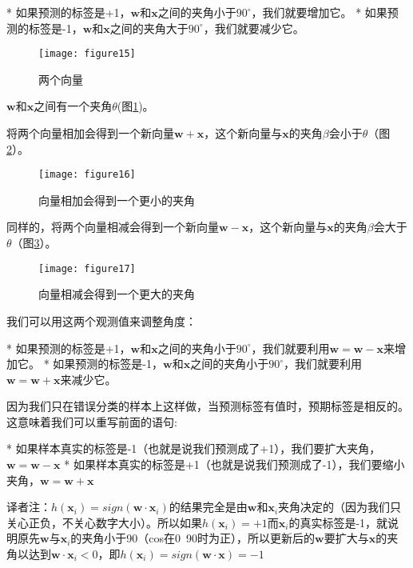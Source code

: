 * 如果预测的标签是+1，$\mathbf{w}$和$\mathbf{x}$之间的夹角小于$90^{\circ}$，我们就要增加它。
* 如果预测的标签是-1，$\mathbf{w}$和$\mathbf{x}$之间的夹角大于$90^{\circ}$，我们就要减少它。

\begin{figure}[ht]
    \centering
    \texttt{[image: figure15]}
    \caption{两个向量}
    \label{figure15}
\end{figure}


$\mathbf{w}$和$\mathbf{x}$之间有一个夹角$\theta$(图\ref{figure15})。

将两个向量相加会得到一个新向量$\mathbf{w}+\mathbf{x}$，这个新向量与$\mathbf{x}$的夹角$\beta$会小于$\theta$（图\ref{figure16}）。

\begin{figure}[ht]
    \centering
    \texttt{[image: figure16]}
    \caption{向量相加会得到一个更小的夹角}
    \label{figure16}
\end{figure}

同样的，将两个向量相减会得到一个新向量$\mathbf{w}-\mathbf{x}$，这个新向量与$\mathbf{x}$的夹角$\beta$会大于$\theta$（图\ref{figure17}）。

\begin{figure}[ht]
    \centering
    \texttt{[image: figure17]}
    \caption{向量相减会得到一个更大的夹角}
    \label{figure17}
\end{figure}


我们可以用这两个观测值来调整角度：

* 如果预测的标签是+1，$\mathbf{w}$和$\mathbf{x}$之间的夹角小于$90^{\circ}$，我们就要利用$\mathbf{w}=\mathbf{w}-\mathbf{x}$来增加它。
* 如果预测的标签是-1，$\mathbf{w}$和$\mathbf{x}$之间的夹角小于$90^{\circ}$，我们就要利用$\mathbf{w}=\mathbf{w}+\mathbf{x}$来减少它。

因为我们只在错误分类的样本上这样做，当预测标签有值时，预期标签是相反的。这意味着我们可以重写前面的语句:

* 如果样本真实的标签是-1（也就是说我们预测成了+1），我们要扩大夹角，$\mathbf{w}=\mathbf{w}-\mathbf{x}$
* 如果样本真实的标签是+1（也就是说我们预测成了-1），我们要缩小夹角，$\mathbf{w}=\mathbf{w}+\mathbf{x}$

译者注：$h(\mathbf{x}_i)=sign(\mathbf{w} \cdot \mathbf{x}_i)$的结果完全是由$\mathbf{w}$和$\mathbf{x}_i$夹角决定的（因为我们只关心正负，不关心数字大小）。所以如果$h(\mathbf{x}_i)=+1$而$\mathbf{x}_i$的真实标签是-1，就说明原先$\mathbf{w}$与$\mathbf{x}_i$的夹角小于90（cos在0~90时为正），所以更新后的$\mathbf{w}$要扩大与$\mathbf{x}$的夹角以达到$\mathbf{w}\cdot\mathbf{x}_i<0$，即$h(\mathbf{x}_i)=sign(\mathbf{w} \cdot \mathbf{x})=-1$

